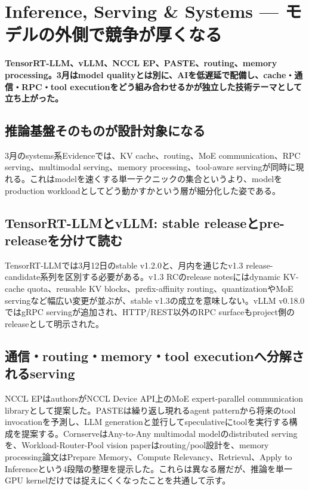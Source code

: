\section{Inference, Serving \& Systems — モデルの外側で競争が厚くなる}
\noindent\textbf{TensorRT-LLM、vLLM、NCCL EP、PASTE、routing、memory processing。3月はmodel qualityとは別に、AIを低遅延で配備し、cache・通信・RPC・tool executionをどう組み合わせるかが独立した技術テーマとして立ち上がった。}\autocite{src-3802d01433c1,src-446e2c561111,src-7e670bf82538,src-d6cda62f02bb,src-fc697f165940}

\subsection{推論基盤そのものが設計対象になる}

3月のsystems系Evidenceでは、KV cache、routing、MoE communication、RPC serving、multimodal serving、memory processing、tool-aware servingが同時に現れる。これはmodelを速くする単一テクニックの集合というより、modelをproduction workloadとしてどう動かすかという層が細分化した姿である。\autocite{src-361b6111931d,src-3802d01433c1,src-446e2c561111,src-795aff00bd48,src-7e670bf82538,src-b08e40540c2a,src-b6e517afaa35,src-d6cda62f02bb,src-fc697f165940}


\subsection{TensorRT-LLMとvLLM: stable releaseとpre-releaseを分けて読む}

TensorRT-LLMでは3月12日のstable v1.2.0と、月内を通じたv1.3 release-candidate系列を区別する必要がある。v1.3 RCのrelease notesにはdynamic KV-cache quota、reusable KV blocks、prefix-affinity routing、quantizationやMoE servingなど幅広い変更が並ぶが、stable v1.3の成立を意味しない。vLLM v0.18.0ではgRPC servingが追加され、HTTP/REST以外のRPC surfaceもproject側のreleaseとして明示された。\autocite{src-7e670bf82538,src-b08e40540c2a,src-d6cda62f02bb,src-fc697f165940}


\subsection{通信・routing・memory・tool executionへ分解されるserving}

NCCL EPはauthorsがNCCL Device API上のMoE expert-parallel communication libraryとして提案した。PASTEは繰り返し現れるagent patternから将来のtool invocationを予測し、LLM generationと並行してspeculativeにtoolを実行する構成を提案する。CornserveはAny-to-Any multimodal modelのdistributed servingを、Workload-Router-Pool vision paperはrouting/pool設計を、memory processing論文はPrepare Memory、Compute Relevancy、Retrieval、Apply to Inferenceという4段階の整理を提示した。これらは異なる層だが、推論を単一GPU kernelだけでは捉えにくくなったことを共通して示す。\autocite{src-361b6111931d,src-3802d01433c1,src-446e2c561111,src-795aff00bd48,src-b6e517afaa35}


